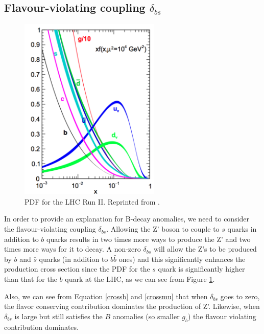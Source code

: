 \subsection{Flavour-violating coupling $\delta_{bs}$}

\begin{figure}[h]
 	\centering
 	\includegraphics[width=0.6\textwidth]{figures/pdfs.png}
 	\singlespace
 	\caption{PDF for the LHC Run II. Reprinted from \cite{Ball:2014uwa}.}
 	\label{fig:pdfs1}
 \end{figure}

In order to provide an explanation for B-decay anomalies, we need to consider the flavour-violating coupling $\delta_{bs}$. Allowing the Z' boson to couple to $s$ quarks in addition to $b$ quarks results in two times more ways to produce the Z' and two times more ways for it to decay. A non-zero $\delta_{bs}$ will allow the Z's to be produced by $b$ and $\bar{s}$ quarks (in addition to $b\bar{b}$ ones) and this significantly enhances the production cross section since the PDF for the $s$ quark is significantly higher than that for the $b$ quark at the LHC, as we can see from Figure \ref{fig:pdfs1}.

Also, we can see from Equation \ref{crossb} and \ref{crossmu} that when $\delta_{bs}$ goes to zero, the flavor conserving contribution dominates the production of Z'. Likewise, when $\delta_{bs}$ is large but still satisfies the $B$ anomalies (so smaller $g_{b}$) the flavour violating contribution dominates.


